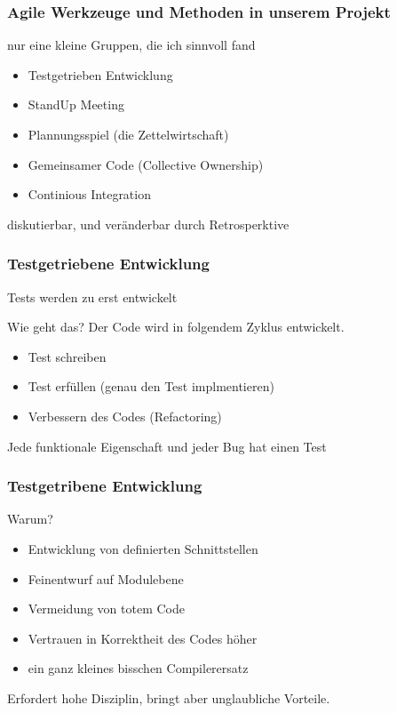 \documentclass{beamer}
\begin{document}
\begin{frame}
    \frametitle{Agile Werkzeuge und Methoden  in unserem Projekt}

    nur eine kleine Gruppen, die ich sinnvoll fand

    \begin{itemize}
        \item Testgetrieben Entwicklung
        \item StandUp Meeting
        \item Plannungsspiel (die Zettelwirtschaft)
        \item Gemeinsamer Code (Collective Ownership)
        \item Continious Integration
    \end{itemize}

    diskutierbar, und veränderbar durch Retrosperktive

\end{frame}


\begin{frame}
    \frametitle{Testgetriebene Entwicklung}
    
    Tests werden zu erst entwickelt

    \begin{block}{Wie geht das?}
        Der Code wird in folgendem Zyklus entwickelt.
        \begin{itemize}
            \item Test schreiben
            \item Test erfüllen (genau den Test implmentieren)
            \item Verbessern des Codes (Refactoring)
        \end{itemize}
    \end{block}
    Jede funktionale Eigenschaft und jeder Bug hat einen Test
\end{frame}


\begin{frame}
    \frametitle{Testgetribene Entwicklung}
    \begin{block}{Warum?}
        \begin{itemize}
            \item Entwicklung von definierten Schnittstellen
            \item Feinentwurf auf Modulebene
            \item Vermeidung von totem Code
            \item Vertrauen in Korrektheit des Codes höher
            \item ein ganz kleines bisschen Compilerersatz
        \end{itemize}
    \end{block}

    Erfordert hohe Disziplin, bringt aber unglaubliche Vorteile.
\end{frame}
\end{document}
